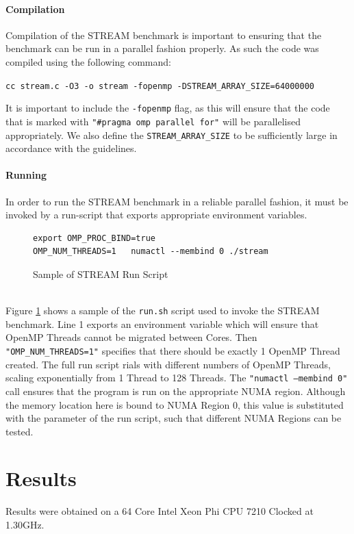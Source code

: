 \documentclass[bsc,frontabs,twoside,singlespacing,parskip,deptreport]{infthesis}     %
\begin{document}
\subsubsection{Compilation}
Compilation of the STREAM benchmark is important to ensuring that the benchmark can be run in a parallel fashion properly. As such the code was compiled using the following command:
\begin{center}
    \texttt{cc stream.c -O3 -o stream -fopenmp -DSTREAM\_ARRAY\_SIZE=64000000}
\end{center}
It is important to include the \texttt{-fopenmp} flag, as this will ensure that the code that is marked with \texttt{"\#pragma omp parallel for"} will be parallelised appropriately. We also define the \texttt{STREAM\_ARRAY\_SIZE} to be sufficiently large in accordance with the guidelines.

\subsubsection{Running}
In order to run the STREAM benchmark in a reliable parallel fashion, it must be invoked by a run-script that exports appropriate environment variables.
{
\begin{figure}[!h]
    \centering
    \begin{verbatim}
export OMP_PROC_BIND=true
OMP_NUM_THREADS=1   numactl --membind 0 ./stream 
    \end{verbatim}
    \caption{Sample of STREAM Run Script}
    \label{fig:stream-run-script}
\end{figure}
} \\

Figure \ref{fig:stream-run-script} shows a sample of the \texttt{run.sh} script used to invoke the STREAM benchmark. Line 1 exports an environment variable which will ensure that OpenMP Threads cannot be migrated between Cores. Then \texttt{"OMP\_NUM\_THREADS=1"} specifies that there should be exactly 1 OpenMP Thread created. The full run script rials with different numbers of OpenMP Threads, scaling exponentially from 1 Thread to 128 Threads. The \texttt{"numactl --membind 0"} call ensures that the program is run on the appropriate NUMA region. Although the memory location here is bound to NUMA Region 0, this value is substituted with the parameter of the run script, such that different NUMA Regions can be tested.

\newpage

\chapter{Results}\label{chap:results}
Results were obtained on a 64 Core Intel Xeon Phi CPU 7210 Clocked at 1.30GHz.
\end{document}
